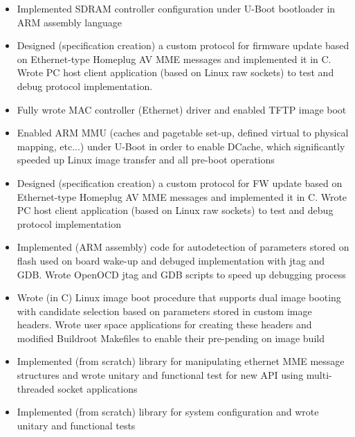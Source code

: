 \documentclass[a4paper, oneside, final]{scrartcl}
\begin{document}
\begin{itemize}
   \item Implemented SDRAM controller configuration under 
            U-Boot bootloader in ARM assembly language
   \item Designed (specification creation) a custom protocol 
            for firmware update based on Ethernet-type Homeplug AV 
            MME messages and implemented it in C. Wrote PC host 
            client application (based on Linux raw sockets) to test 
            and debug protocol implementation.
   \item Fully wrote MAC controller (Ethernet) driver and enabled TFTP image boot
   \item Enabled ARM MMU (caches and pagetable set-up, 
            defined virtual to physical mapping, etc...) under U-Boot 
            in order to enable DCache, which significantly speeded up 
            Linux image transfer and all pre-boot operations
   \item Designed (specification creation) a custom protocol for 
            FW update based on Ethernet-type Homeplug AV MME messages 
            and implemented it in C. Wrote PC host client application 
            (based on Linux raw sockets) to test and debug protocol implementation
   \item Implemented (ARM assembly) code for autodetection of parameters stored on 
            flash used on board wake-up and debuged implementation with jtag and GDB. 
            Wrote OpenOCD jtag and GDB scripts to speed up debugging process
   \item Wrote (in C) Linux image boot procedure that supports dual image 
            booting with candidate selection based on parameters stored in 
            custom image headers. Wrote user space applications for creating 
            these headers and modified Buildroot Makefiles to enable their pre-pending on image build
   \item Implemented (from scratch) library for manipulating ethernet MME message 
            structures and wrote unitary and functional test for new API 
            using multi-threaded socket applications
   \item Implemented (from scratch) library for system configuration 
            and wrote unitary and functional tests
\end{itemize}




\bigskip
\end{document}
